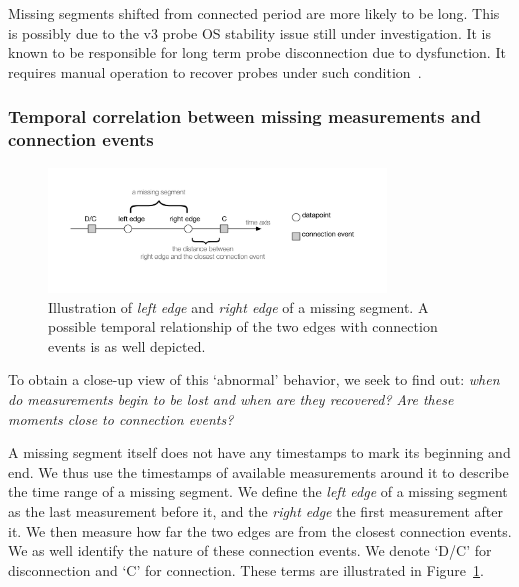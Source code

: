 Missing segments shifted from connected period are more likely to be long. This is possibly due to the v3 probe OS stability issue still under investigation. It is known to be responsible for long term probe disconnection due to dysfunction.
It requires manual operation to recover probes under such condition~\cite{usb, 1look, 2look, 3look}.


\subsubsection{Temporal correlation between missing measurements and connection events}
\begin{figure}[!htb]
\centering
\includegraphics[width=0.8\textwidth]{gfx/chap3/miss_seg_ill.pdf}
\caption{Illustration of \textit{left edge} and \textit{right edge} of a missing segment. A possible temporal relationship of the two edges with connection events is as well depicted.}
\label{fig:miss_seg_ill}
\end{figure}

To obtain a close-up view of this `abnormal' behavior, we seek to find out: \textit{when do measurements begin to be lost and when are they recovered? Are these moments close to connection events?}

A missing segment itself does not have any timestamps to mark its beginning and end.
We thus use the timestamps of available measurements around it to describe the time range of a missing segment.
We define the \textit{left edge} of a missing segment as the last measurement before it, and the \textit{right edge} the first measurement after it.
We then measure how far the two edges are from the closest connection events.
We as well identify the nature of these connection events.
We denote `D/C' for disconnection and `C' for connection. 
These terms are illustrated in Figure~\ref{fig:miss_seg_ill}.

